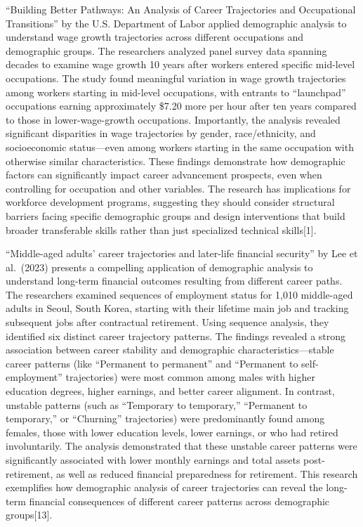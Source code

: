 \documentclass[./main.tex]{subfiles}
\begin{document}
``Building Better Pathways: An Analysis of Career Trajectories and
Occupational Transitions'' by the U.S. Department of Labor applied
demographic analysis to understand wage growth trajectories across
different occupations and demographic groups. The researchers analyzed
panel survey data spanning decades to examine wage growth 10 years after
workers entered specific mid-level occupations. The study found
meaningful variation in wage growth trajectories among workers starting
in mid-level occupations, with entrants to ``launchpad'' occupations
earning approximately \$7.20 more per hour after ten years compared to
those in lower-wage-growth occupations. Importantly, the analysis
revealed significant disparities in wage trajectories by gender,
race/ethnicity, and socioeconomic status---even among workers starting
in the same occupation with otherwise similar characteristics. These
findings demonstrate how demographic factors can significantly impact
career advancement prospects, even when controlling for occupation and
other variables. The research has implications for workforce development
programs, suggesting they should consider structural barriers facing
specific demographic groups and design interventions that build broader
transferable skills rather than just specialized technical
skills{[}1{]}.

``Middle-aged adults' career trajectories and later-life financial
security'' by Lee et al.~(2023) presents a compelling application of
demographic analysis to understand long-term financial outcomes
resulting from different career paths. The researchers examined
sequences of employment status for 1,010 middle-aged adults in Seoul,
South Korea, starting with their lifetime main job and tracking
subsequent jobs after contractual retirement. Using sequence analysis,
they identified six distinct career trajectory patterns. The findings
revealed a strong association between career stability and demographic
characteristics---stable career patterns (like ``Permanent to
permanent'' and ``Permanent to self-employment'' trajectories) were most
common among males with higher education degrees, higher earnings, and
better career alignment. In contrast, unstable patterns (such as
``Temporary to temporary,'' ``Permanent to temporary,'' or ``Churning''
trajectories) were predominantly found among females, those with lower
education levels, lower earnings, or who had retired involuntarily. The
analysis demonstrated that these unstable career patterns were
significantly associated with lower monthly earnings and total assets
post-retirement, as well as reduced financial preparedness for
retirement. This research exemplifies how demographic analysis of career
trajectories can reveal the long-term financial consequences of
different career patterns across demographic groups{[}13{]}.
\end{document}
